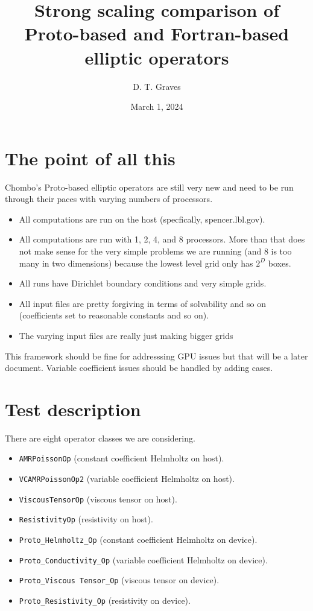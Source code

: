\documentclass{article}
\begin{document}
\title{Strong scaling comparison of Proto-based and Fortran-based elliptic operators}
\author{D. T. Graves   }
\date{March 1, 2024}

\maketitle

\section{The point of all this}

Chombo's Proto-based elliptic operators are still very new and need to
be run through their paces with varying numbers of processors.
\begin{itemize}
  \item All computations are run on the host (specfically, spencer.lbl.gov).
  \item All computations are run with 1, 2, 4, and 8 processors.
    More than that does not make sense for the very simple problems we
    are running (and 8 is too many in two dimensions) because the
    lowest level grid only has $2^D$ boxes.
  \item All runs have Dirichlet boundary conditions and very simple
    grids.
  \item All input files are pretty forgiving in terms of solvability
    and so on (coefficients set to reasonable constants and so on).
  \item The varying input files are really just making bigger grids
\end{itemize}
 This framework should be fine for addresssing GPU issues but that
 will  be a later document.    Variable coefficient issues should be
 handled by adding cases.
 
 \section{Test description}

 There are eight operator classes we are considering.
 \begin{itemize}
 \item {\tt AMRPoissonOp} (constant coefficient Helmholtz on   host).
 \item {\tt VCAMRPoissonOp2} (variable coefficient Helmholtz on host).
 \item {\tt ViscousTensorOp} (viscous tensor on host).
 \item {\tt ResistivityOp} (resistivity on host).
 \item {\tt Proto\_Helmholtz\_Op} (constant coefficient Helmholtz on device).
 \item {\tt Proto\_Conductivity\_Op} (variable coefficient Helmholtz on device).
 \item {\tt Proto\_Viscous Tensor\_Op} (viscous tensor on device).
 \item {\tt Proto\_Resistivity\_Op} (resistivity on device).
 \end{itemize}
\end{document}

